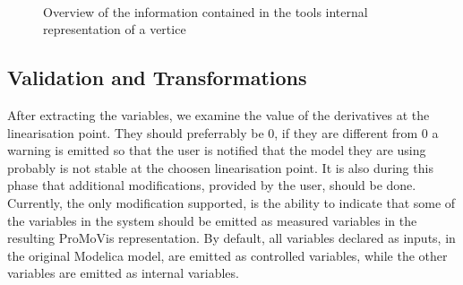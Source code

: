 %
\begin{figure}
\\\newline 
\caption{Overview of the information contained in the tools internal representation of a vertice}
\label{fig:internalrep}
\end{figure}
%
\subsection{Validation and Transformations}
After extracting the variables, we examine the value of the derivatives at the linearisation point. They should preferrably be 0, if they are different from 0 a warning is emitted so that the user is notified that the model they are using probably is not stable at the choosen linearisation point. It is also during this phase that additional modifications, provided by the user, should be done. Currently, the only modification supported, is the ability to indicate that some of the variables in the system should be emitted as measured variables in the resulting ProMoVis representation. By default, all variables declared as inputs, in the original Modelica model,  are emitted as controlled variables, while the other variables are emitted as internal variables.
